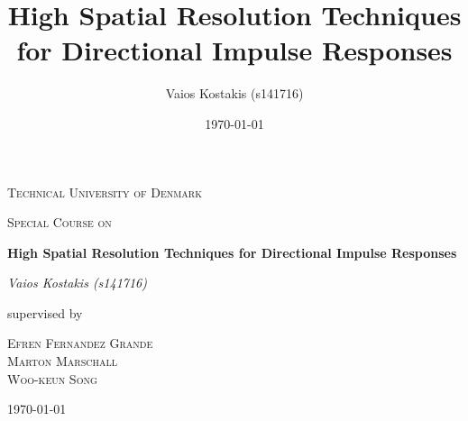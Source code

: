 \documentclass[11pt,a4paper,UKenglish]{report}
\title{\huge{High Spatial Resolution Techniques for Directional Impulse Responses}}
\author{ Vaios Kostakis (s141716)
}
\date{\today}
\begin{document}
% 

\begin{titlepage}
	\centering
	{\scshape\Large Technical University of Denmark \par}
	\vspace{1.5cm}
	{\scshape\large Special Course on \par}
	\vspace{0.5cm}
	{\huge\bfseries High Spatial Resolution Techniques for Directional Impulse Responses\par}
	\vspace{2cm}
	{\Large\itshape Vaios Kostakis (s141716)\par}
	\vfill
	supervised by\par
	\textsc{Efren Fernandez Grande \\
	Marton Marschall\\
	Woo-keun Song}

	\vfill

	{\large \today\par}
\end{titlepage}

% 
\tableofcontents

% 








\appendix


\end{document}
